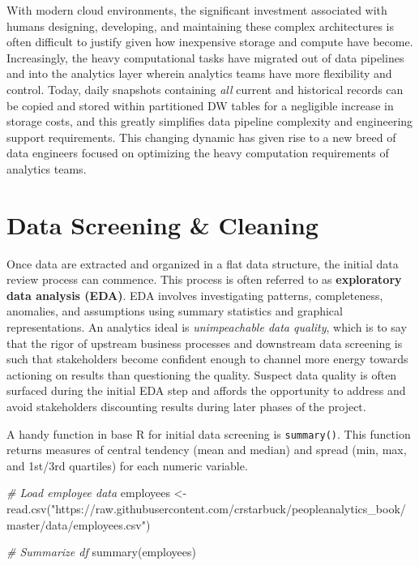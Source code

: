 \documentclass[
]{book}
\newenvironment{Shaded}{\begin{snugshade}}{\end{snugshade}}
\newcommand{\CommentTok}[1]{\textcolor[rgb]{0.56,0.35,0.01}{\textit{#1}}}
\newcommand{\FunctionTok}[1]{\textcolor[rgb]{0.00,0.00,0.00}{#1}}
\newcommand{\NormalTok}[1]{#1}
\newcommand{\OtherTok}[1]{\textcolor[rgb]{0.56,0.35,0.01}{#1}}
\newcommand{\StringTok}[1]{\textcolor[rgb]{0.31,0.60,0.02}{#1}}
\begin{document}
With modern cloud environments, the significant investment associated with humans designing, developing, and maintaining these complex architectures is often difficult to justify given how inexpensive storage and compute have become. Increasingly, the heavy computational tasks have migrated out of data pipelines and into the analytics layer wherein analytics teams have more flexibility and control. Today, daily snapshots containing \emph{all} current and historical records can be copied and stored within partitioned DW tables for a negligible increase in storage costs, and this greatly simplifies data pipeline complexity and engineering support requirements. This changing dynamic has given rise to a new breed of data engineers focused on optimizing the heavy computation requirements of analytics teams.

\hypertarget{data-screening-cleaning}{%
\section{Data Screening \& Cleaning}\label{data-screening-cleaning}}

Once data are extracted and organized in a flat data structure, the initial data review process can commence. This process is often referred to as \textbf{exploratory data analysis (EDA)}. EDA involves investigating patterns, completeness, anomalies, and assumptions using summary statistics and graphical representations. An analytics ideal is \emph{unimpeachable data quality}, which is to say that the rigor of upstream business processes and downstream data screening is such that stakeholders become confident enough to channel more energy towards actioning on results than questioning the quality. Suspect data quality is often surfaced during the initial EDA step and affords the opportunity to address and avoid stakeholders discounting results during later phases of the project.

A handy function in base R for initial data screening is \texttt{summary()}. This function returns measures of central tendency (mean and median) and spread (min, max, and 1st/3rd quartiles) for each numeric variable.

\begin{Shaded}
\begin{Highlighting}[]
\CommentTok{\# Load employee data}
\NormalTok{employees }\OtherTok{\textless{}{-}} \FunctionTok{read.csv}\NormalTok{(}\StringTok{"https://raw.githubusercontent.com/crstarbuck/peopleanalytics\_book/master/data/employees.csv"}\NormalTok{)}

\CommentTok{\# Summarize df}
\FunctionTok{summary}\NormalTok{(employees)}
\end{Highlighting}
\end{Shaded}
\end{document}
